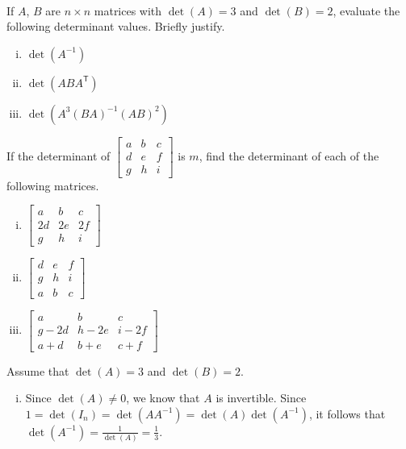 \begin{example} ~
	\ba
	\item If $A$, $B$ are $n\times n$ matrices with $\det(A)=3$ and $\det(B)=2$, evaluate the following determinant values. Briefly justify.\\
		\begin{enumerate}[i.]
		\item $\det(A^{-1})$

		\item $\det(ABA^{\mathsf{T}})$

		\item $\det(A^3(BA)^{-1}(AB)^2)$
		
		\end{enumerate}
		
	\item If the determinant of $\left[ \begin{array}{ccc} a&b&c\\d&e&f\\g&h&i\end{array} \right]$ is $m$, find the determinant of each of the following matrices.

		\begin{enumerate}[i.]
		\item $\left[ \begin{array}{ccc} a&b&c\\2d&2e&2f\\g&h&i\end{array} \right]$

		\item $\left[ \begin{array}{ccc} d&e&f\\g&h&i\\a&b&c\end{array} \right]$

		\item $\left[ \begin{array}{ccc} a&b&c\\g-2d&h-2e&i-2f\\a+d&b+e&c+f \end{array} \right]$
		\end{enumerate}
		
	\ea


\ExampleSolution
	\ba
	\item Assume that $\det(A)=3$ and $\det(B)=2$. 
		\begin{enumerate}[i.]
		\item Since $\det(A) \neq 0$, we know that $A$ is invertible. Since $1 = \det(I_n) = \det(AA^{-1}) = \det(A) \det(A^{-1})$, it follows that $\det(A^{-1}) = \frac{1}{\det(A)} = \frac{1}{3}$. 
		

\end{enumerate}
\end{example}
